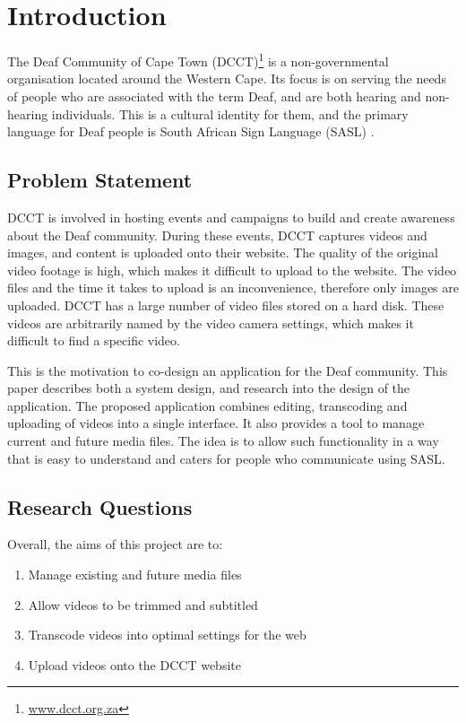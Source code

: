 \documentclass{sig-alternate-05-2015}
\begin{document}
\section{Introduction}
The Deaf Community of Cape Town (DCCT)\footnote{\href{http://www.dcct.org.za/}{www.dcct.org.za}} is a non-governmental organisation located around the Western Cape. Its focus is on serving the needs of people who are associated with the term Deaf, and are both hearing and non-hearing individuals. This is a cultural identity for them, and the primary language for Deaf people is South African Sign Language (SASL) \cite{glaser2012inclusive}.

\subsection{Problem Statement}
DCCT is involved in hosting events and campaigns to build and create awareness about the Deaf community. During these events, DCCT captures videos and images, and content is uploaded onto their website. The quality of the original video footage is high, which makes it difficult to upload to the website. The video files and the time it takes to upload is an inconvenience, therefore only images are uploaded. DCCT has a large number of video files stored on a hard disk. These videos are arbitrarily named by the video camera settings, which makes it difficult to find a specific video.

This is the motivation to co-design an application for the Deaf community. This paper describes both a system design, and research into the design of the application. The proposed application combines editing, transcoding and uploading of videos into a single interface. It also provides a tool to manage current and future media files. The idea is to allow such functionality in a way that is easy to understand and caters for people who communicate using SASL.

\subsection{Research Questions}
Overall, the aims of this project are to:
\begin{enumerate}
  \item Manage existing and future media files
  \item Allow videos to be trimmed and subtitled
  \item Transcode videos into optimal settings for the web
  \item Upload videos onto the DCCT website
\end{enumerate}
\end{document}
